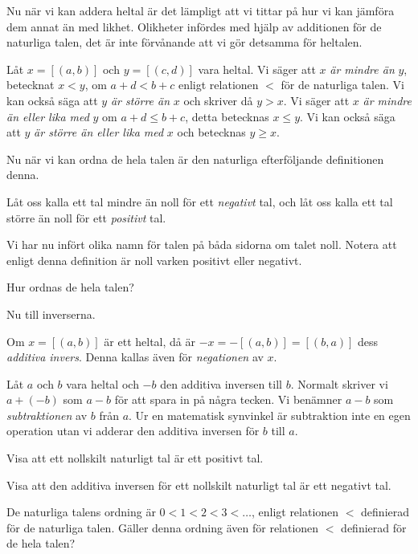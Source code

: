 Nu när vi kan addera heltal är det lämpligt att vi tittar på hur vi kan jämföra
dem annat än med likhet.
Olikheter infördes med hjälp av additionen för de naturliga talen, det är inte
förvånande att vi gör detsamma för heltalen.
\begin{definition}[Olikhet]
  Låt \(x=[(a,b)]\) och \(y=[(c,d)]\) vara heltal.
  Vi säger att \(x\) \emph{är mindre än} \(y\), betecknat \(x<y\), om
  \(a+d<b+c\) enligt relationen \(<\) för de naturliga talen.
  Vi kan också säga att \(y\) \emph{är större än} \(x\) och skriver då
  \(y>x\).
  Vi säger att \(x\) \emph{är mindre än eller lika med} \(y\) om \(a+d\leq
  b+c\), detta betecknas \(x\leq y\).
  Vi kan också säga att \(y\) \emph{är större än eller lika med} \(x\) och
  betecknas \(y\geq x\).
\end{definition}

Nu när vi kan ordna de hela talen är den naturliga efterföljande definitionen
denna.
\begin{definition}
  Låt oss kalla ett tal mindre än noll för ett \emph{negativt} tal, och låt
  oss kalla ett tal större än noll för ett \emph{positivt} tal.
\end{definition}
Vi har nu infört olika namn för talen på båda sidorna om talet noll.
Notera att enligt denna definition är noll varken positivt eller negativt.

\begin{exercise}
  Hur ordnas de hela talen?
\end{exercise}

Nu till inverserna.
\begin{definition}
  Om \(x=[(a,b)]\) är ett heltal, då är \(-x=-[(a,b)]=[(b,a)]\) dess
  \emph{additiva invers}.
  Denna kallas även för \emph{negationen} av \(x\).
\end{definition}
\begin{remark}
  Låt \(a\) och \(b\) vara heltal och \(-b\) den additiva inversen till
  \(b\).
  Normalt skriver vi \(a+(-b)\) som \(a-b\) för att spara in på några tecken.
  Vi benämner \(a-b\) som \emph{subtraktionen} av \(b\)
  från \(a\).
  Ur en matematisk synvinkel är subtraktion inte en egen operation utan vi
  adderar den additiva inversen för \(b\) till \(a\).
\end{remark}

\begin{exercise}
  Visa att ett nollskilt naturligt tal är ett positivt tal.
\end{exercise}
\begin{exercise}
  Visa att den additiva inversen för ett nollskilt naturligt tal är ett
  negativt tal.
\end{exercise}
\begin{exercise}
  De naturliga talens ordning är \(0 < 1 < 2 < 3 < \ldots\), enligt relationen 
  \(<\) definierad för de naturliga talen.
  Gäller denna ordning även för relationen \(<\) definierad för de hela talen?
\end{exercise}

